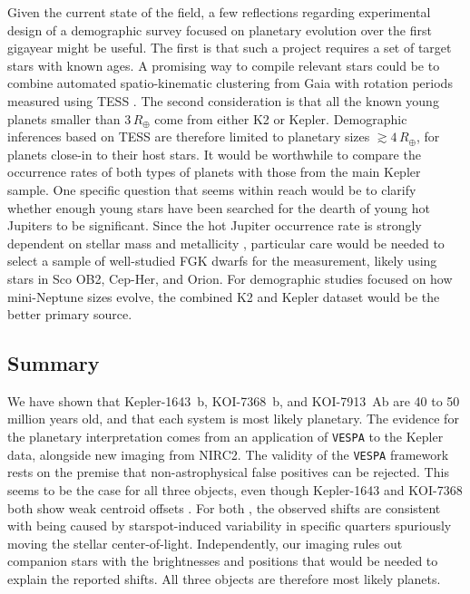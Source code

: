 \documentclass[12pt,twocolumn,tighten,linenumbers]{aastex63}
\begin{document}
Given the current state of the field, a few reflections regarding
experimental design of a demographic survey focused on planetary
evolution over the first gigayear might be useful.  The first is that
such a project requires a set of target stars with known ages.  A
promising way to compile relevant stars could be to combine automated
spatio-kinematic clustering from Gaia with rotation periods measured
using TESS \citep[see the appendices of][]{bouma_kep1627_2022}.  The
second consideration is that all the known young planets smaller than
$3$\,$R_\oplus$ come from either K2 or Kepler.  Demographic inferences
based on TESS are therefore limited to planetary sizes
$\gtrsim4$\,$R_\oplus$, for planets close-in to their host stars.  It
would be worthwhile to compare the occurrence rates of both types of
planets with those from the main Kepler sample.  One specific question
that seems within reach would be to clarify whether enough young stars
have been searched for the dearth of young hot Jupiters to be
significant.  Since the hot Jupiter occurrence rate is strongly
dependent on stellar mass and metallicity
\citep{petigura_metallicity_2018,petigura_cksX_2022}, particular care
would be needed to select a sample of well-studied FGK dwarfs for the
measurement, likely using stars in Sco OB2, Cep-Her, and Orion.  For
demographic studies focused on how mini-Neptune sizes evolve, the
combined K2 and Kepler dataset would be the better primary source.  



\subsection{Summary}

We have shown that Kepler-1643~b, KOI-7368~b, and KOI-7913~Ab are 40
to 50 million years old, and that each system is most likely
planetary.  The evidence for the planetary interpretation comes from
an application of \texttt{VESPA} to the Kepler data, alongside new
imaging from NIRC2.  The validity of the \texttt{VESPA} framework
rests on the premise that non-astrophysical false positives can be
rejected.  
This seems to be the case for all three objects, even though
Kepler-1643 and KOI-7368 
both show weak centroid offsets .  For both , the observed shifts
are consistent with being caused by starspot-induced variability in
specific quarters spuriously moving the stellar center-of-light.
Independently, our imaging rules out companion stars with the
brightnesses and positions that would be needed to explain the
reported shifts.  All three objects are therefore most likely planets.
\end{document}
